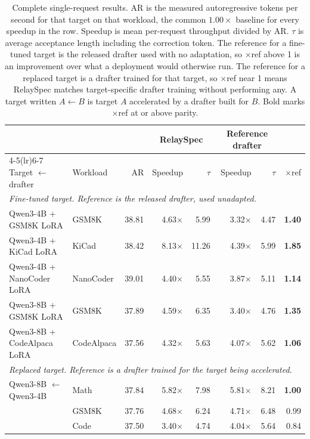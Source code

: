 \begin{table}[t]
\centering
\caption{Complete single-request results. AR is the measured autoregressive tokens per second for that target on that workload, the common $1.00\times$ baseline for every speedup in the row. Speedup is mean per-request throughput divided by AR. $\tau$ is average acceptance length including the correction token. The reference for a fine-tuned target is the released drafter used with no adaptation, so $\times$ref above 1 is an improvement over what a deployment would otherwise run. The reference for a replaced target is a drafter trained for that target, so $\times$ref near 1 means RelaySpec matches target-specific drafter training without performing any. A target written $A\leftarrow B$ is target $A$ accelerated by a drafter built for $B$. Bold marks $\times$ref at or above parity.}
\label{tab:main}
\small
\setlength{\tabcolsep}{4.2pt}
\begin{tabular}{llrrrrrr}
\toprule
& & & \multicolumn{2}{c}{RelaySpec} & \multicolumn{2}{c}{Reference drafter} & \\
\cmidrule(lr){4-5}\cmidrule(lr){6-7}
Target $\leftarrow$ drafter & Workload & AR & Speedup & $\tau$ & Speedup & $\tau$ & $\times$ref \\
\midrule
\multicolumn{8}{l}{\emph{Fine-tuned target. Reference is the released drafter, used unadapted.}} \\
Qwen3-4B + GSM8K LoRA & GSM8K & 38.81 & 4.63$\times$ & 5.99 & 3.32$\times$ & 4.47 & \textbf{1.40} \\
Qwen3-4B + KiCad LoRA & KiCad & 38.42 & 8.13$\times$ & 11.26 & 4.39$\times$ & 5.99 & \textbf{1.85} \\
Qwen3-4B + NanoCoder LoRA & NanoCoder & 39.01 & 4.40$\times$ & 5.55 & 3.87$\times$ & 5.11 & \textbf{1.14} \\
Qwen3-8B + GSM8K LoRA & GSM8K & 37.89 & 4.59$\times$ & 6.35 & 3.40$\times$ & 4.76 & \textbf{1.35} \\
Qwen3-8B + CodeAlpaca LoRA & CodeAlpaca & 37.56 & 4.32$\times$ & 5.63 & 4.07$\times$ & 5.62 & \textbf{1.06} \\
\midrule
\multicolumn{8}{l}{\emph{Replaced target. Reference is a drafter trained for the target being accelerated.}} \\
Qwen3-8B $\leftarrow$ Qwen3-4B & Math & 37.84 & 5.82$\times$ & 7.98 & 5.81$\times$ & 8.21 & \textbf{1.00} \\
 & GSM8K & 37.76 & 4.68$\times$ & 6.24 & 4.71$\times$ & 6.48 & 0.99 \\
 & Code & 37.50 & 3.40$\times$ & 4.74 & 4.04$\times$ & 5.64 & 0.84 \\

\end{tabular}
\end{table}
